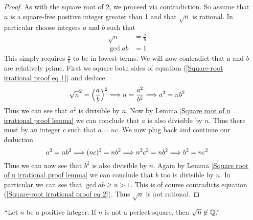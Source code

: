         \begin{proof}
            As with the square root of 2, we proceed via contradiction. So assume that $n$
            is a square-free positive integer greater than 1 and that $\sqrt{n}$ is rational.
            In particular choose integers $a$ and $b$ such that
            \begin{align}
                \label{Square-root irrational proof eq 1}
                \sqrt{n} &= \frac{a}{b} \\
                \gcd{a}{b} &= 1
                \label{Square-root irrational proof eq 2}
            \end{align}
            This simply requires $\frac{a}{b}$ to be in lowest terms. We will now contradict
            that $a$ and $b$ are relatively prime. First we square both sides of equation
            (\ref{Square-root irrational proof eq 1}) and deduce
            \[
                \sqrt{n}^2 = \left( \frac{a}{b}\right)^2 \Longrightarrow
                n = \frac{a^2}{b^2} \Longrightarrow
                a^2 = nb^2
            \]
            Thus we can see that $a^2$ is divisible by $n$. Now by Lemma
            \ref{Square root of n irrational proof lemma} we can conclude that $a$ is
            also divisible by $n$. Thus there must by an integer $c$ such that
            $a = nc$. We now plug back and continue our deduction
            \[
                a^2 = nb^2 \Longrightarrow
                (nc)^2 = nb^2 \Longrightarrow
                n^2c^2 = nb^2 \Longrightarrow
                b^2 = nc^2
            \]
            Thus we can now see that $b^2$ is also divisible by $n$. Again by Lemma
            \ref{Square root of n irrational proof lemma} we can conclude that $b$ too
            is divisible by $n$. In particular we can see that $\gcd{a}{b} \ge n > 1$.
            This is of course contradicts
            equation (\ref{Square-root irrational proof eq 2}).
            Thus $\sqrt{n}$ is not rational. \QED
        \end{proof}
        \begin{corollary}
            $``$Let $n$ be a positive integer. If $n$ is not a perfect square, then
            $\sqrt{n} \not\in \mathbb{Q}$.''
        \end{corollary}

